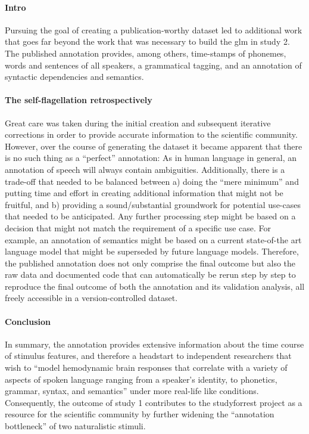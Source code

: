 \paragraph{Intro}

Pursuing the goal of creating a publication-worthy dataset led to additional
work that goes far beyond the work that was necessary to build the \ac{glm} in
study 2.
The published annotation provides, among others, time-stamps of phonemes, words
and sentences of all speakers, a grammatical tagging, and an annotation of
syntactic dependencies and semantics.


\paragraph{The self-flagellation retrospectively}
%
Great care was taken during the initial creation and subsequent iterative
corrections in order to provide accurate information to the scientific
community.
%
However, over the course of generating the dataset it became apparent that there
is no such thing as a ``perfect'' annotation:
%
As in human language in general, an annotation of speech will always contain
ambiguities.
%
Additionally, there is a trade-off that needed to be balanced between a) doing
the ``mere minimum'' and putting time and effort in creating additional
information that might not be fruitful, and b) providing a sound/substantial
groundwork for potential use-cases that needed to be anticipated.
%
Any further processing step might be based on a decision that might not match
the requirement of a specific use case.
%
For example, an annotation of semantics might be based on a current state-of-the
art language model that might be superseded by future language models.
%
Therefore, the published annotation does not only comprise the final outcome but
also the raw data and documented code that can automatically be rerun step by
step to reproduce the final outcome of both the annotation and its validation
analysis, all freely accessible in a version-controlled dataset.


\paragraph{Conclusion}
%
In summary, the annotation provides extensive information about the time course
of stimulus features, and therefore a headstart to independent researchers that
wish to ``model hemodynamic brain responses that correlate with a variety of
aspects of spoken language ranging from a speaker's identity, to phonetics,
grammar, syntax, and semantics'' \citep{haeusler2021speechanno} under more
real-life like conditions.
%
Consequently, the outcome of study 1 contributes to the studyforrest project as
a resource for the scientific community by further widening the ``annotation
bottleneck'' \citep{aliko2020naturalistic} of two naturalistic stimuli.



